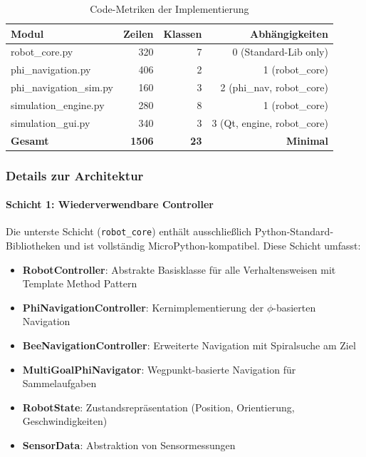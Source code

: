 ﻿\documentclass[a4paper,12pt]{article}
\theoremstyle{definition}
\begin{document}
\begin{table}[H]
	\centering
	\caption{Code-Metriken der Implementierung}
	\label{tab:code_metrics}
	\begin{tabular}{lrrr}
		\toprule
		\textbf{Modul} & \textbf{Zeilen} & \textbf{Klassen} & \textbf{Abhängigkeiten} \\
		\midrule
		robot\_core.py & 320 & 7 & 0 (Standard-Lib only) \\
		phi\_navigation.py & 406 & 2 & 1 (robot\_core) \\
		phi\_navigation\_sim.py & 160 & 3 & 2 (phi\_nav, robot\_core) \\
		simulation\_engine.py & 280 & 8 & 1 (robot\_core) \\
		simulation\_gui.py & 340 & 3 & 3 (Qt, engine, robot\_core) \\
		\midrule
		\textbf{Gesamt} & \textbf{1506} & \textbf{23} & \textbf{Minimal} \\
		\bottomrule
	\end{tabular}
\end{table}

\subsubsection{Details zur Architektur}

\paragraph{Schicht 1: Wiederverwendbare Controller}

Die unterste Schicht (\texttt{robot\_core}) enthält ausschließlich Python-Standard-Bibliotheken und ist vollständig MicroPython-kompa\-tibel. Diese Schicht umfasst:

\begin{itemize}
	\item \textbf{RobotController}: Abstrakte Basisklasse für alle Verhaltensweisen mit Template Method Pattern
	\item \textbf{PhiNavigationController}: Kernimplementierung der $\phi$-basierten Navigation
	\item \textbf{BeeNavigationController}: Erweiterte Navigation mit Spiralsuche am Ziel
	\item \textbf{MultiGoalPhiNavigator}: Wegpunkt-basierte Navigation für Sammelaufgaben
	\item \textbf{RobotState}: Zustandsrepräsentation (Position, Orientierung, Geschwindigkeiten)
	\item \textbf{SensorData}: Abstraktion von Sensormessungen
\end{itemize}
\end{document}
